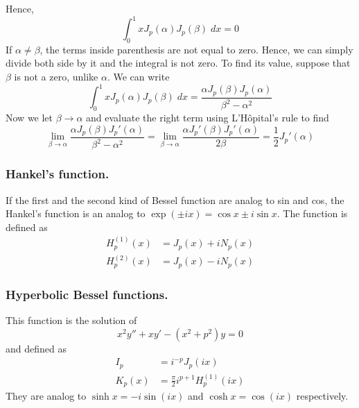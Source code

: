 \documentclass[../main.tex]{subfiles}
\begin{document}
Hence,
\begin{equation*}
    \int_{0}^{1}xJ_p(\alpha)J_p(\beta)\;dx=0
\end{equation*}
If $\alpha\neq\beta$, the terms inside parenthesis are not equal to zero.
Hence, we can simply divide both side by it and the integral is not zero.
To find its value, suppose that $\beta$ is not a zero, unlike $\alpha$.
We can write
\begin{equation*}
    \int_{0}^{1}xJ_p(\alpha)J_p(\beta)\;dx=\frac{\alpha J_p(\beta)J_p(\alpha)}{\beta^2-\alpha^2}
\end{equation*}
Now we let $\beta\rightarrow\alpha$ and evaluate the right term using  L'Hôpital's rule to find
\begin{equation*}
    \lim_{\beta\rightarrow\alpha}\frac{\alpha J_p(\beta)J_p'(\alpha)}{\beta^2-\alpha^2} =\lim_{\beta\rightarrow\alpha}\frac{\alpha J_p'(\beta)J_p'(\alpha)}{2\beta}=\frac{1}{2}J_p'(\alpha)
\end{equation*}


\subsubsection*{Hankel's function.} If the first and the second kind of Bessel function are analog to sin and cos, the Hankel's function is an analog to $\exp(\pm ix)=\cos x \pm i\sin x$.
The function is defined as
\begin{align*}
    H_p^{(1)}(x) & =J_p(x)+iN_p(x) \\
    H_p^{(2)}(x) & =J_p(x)-iN_p(x)
\end{align*}

\subsubsection*{Hyperbolic Bessel functions.} This function is the solution of
\begin{equation*}
    x^2y''+xy'-(x^2+p^2)y=0
\end{equation*}
and defined as
\begin{align*}
    I_p    & =i^{-p}J_p(ix)                     \\
    K_p(x) & =\frac{\pi}{2}i^{p+1}H_p^{(1)}(ix)
\end{align*}
They are analog to $\sinh x= -i\sin (ix)$ and $\cosh x=\cos (ix)$ respectively.
\end{document}
